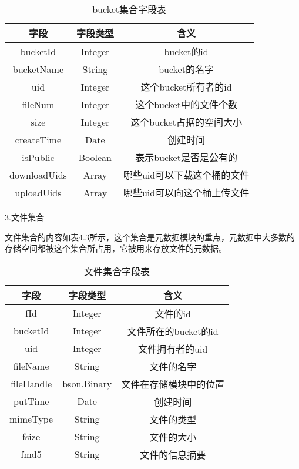 \begin{table}[h]
    \centering
    \vspace{10pt}
    \caption{bucket集合字段表}
    \vspace{-15pt}
    \begin{tabular}{ccc}
      \toprule
      字段   & 字段类型   & 含义                          \\
      \midrule
      bucketId      & Integer  & bucket的id                 \\
      bucketName    & String   & bucket的名字                \\
      uid           & Integer  & 这个bucket所有者的id         \\
      fileNum       & Integer  & 这个bucket中的文件个数         \\
      size          & Integer  & 这个bucket占据的空间大小         \\
      createTime    & Date     & 创建时间                     \\
      isPublic      & Boolean  & 表示bucket是否是公有的        \\
      downloadUids  & Array    & 哪些uid可以下载这个桶的文件  \\
      uploadUids    & Array    & 哪些uid可以向这个桶上传文件  \\
      \bottomrule
    \end{tabular}
\end{table}

3.文件集合

文件集合的内容如表4.3所示，这个集合是元数据模块的重点，元数据中大多数的存储空间都被这个集合所占用，它被用来存放文件的元数据。

\begin{table}[h]
  \centering
  \vspace{10pt}
  \caption{文件集合字段表}
  \vspace{-15pt}
  \begin{tabular}{ccc}
    \toprule
    字段   & 字段类型   & 含义                          \\
    \midrule
    fId        & Integer     & 文件的id                 \\
    bucketId   & Integer     & 文件所在的bucket的id                 \\
    uid        & Integer     & 文件拥有者的uid                 \\
    fileName   & String      & 文件的名字                \\
    fileHandle & bson.Binary & 文件在存储模块中的位置         \\
    putTime    & Date        & 创建时间                     \\
    mimeType   & String      & 文件的类型        \\
    fsize      & String      & 文件的大小  \\
    fmd5       & String      & 文件的信息摘要  \\
    \bottomrule
  \end{tabular}
\end{table}

